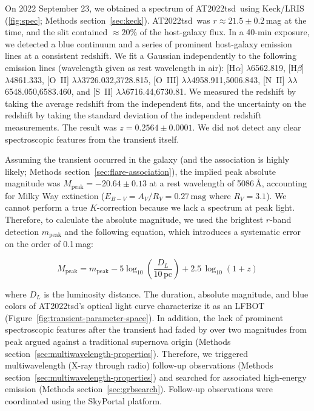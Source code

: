\documentclass{nature_plusfigure}
\newcommand{\at}{AT2022tsd}
\begin{document}
\begin{methods}
On 2022 September 23, we obtained a spectrum of \at\ using Keck/LRIS (\ref{fig:spec}; Methods section~\ref{sec:keck}).
\at\ was $r\approx21.5\pm0.2$\,mag at the time, and the slit contained $\approx20\%$ of the host-galaxy flux.
In a 40-min exposure, we detected a blue continuum and a series of prominent host-galaxy emission lines at a consistent redshift. We fit a Gaussian independently to the following emission lines (wavelength given as rest wavelength in air): [H$\alpha$] $\lambda$6562.819, [H$\beta$] $\lambda$4861.333,  [O~II] $\lambda$$\lambda$3726.032,3728.815,
 [O~III] $\lambda$$\lambda$4958.911,5006.843, 
  [N~II] $\lambda$$\lambda$6548.050,6583.460, and [S~II] $\lambda\lambda$6716.44,6730.81. 
We measured the redshift by taking the average redshift from the independent fits, and the uncertainty on the redshift by taking the standard deviation of the independent redshift measurements.
The result was $z=0.2564\pm0.0001$.
We did not detect any clear spectroscopic features from the transient itself.

Assuming the transient occurred in the galaxy (and the association is highly likely; Methods section~\ref{sec:flare-association}), the implied peak absolute magnitude was $M_{\mathrm{peak}}=-20.64\pm0.13$ at a rest wavelength of 5086\,\AA, accounting for Milky Way extinction ($E_{B-V}=A_V/R_V=0.27\,\mathrm{mag}$ where $R_V=3.1$)\cite{Finkbeiner1999,Schlegel1998,Schlafly2011}. 
We cannot perform a true $K$-correction because we lack a spectrum at peak light.
Therefore, to calculate the absolute magnitude, we used the brightest $r$-band detection $m_\mathrm{peak}$ and the following equation, which introduces a systematic error on the order of 0.1\,mag\cite{Whitesides2017}:

\begin{equation}
M_\mathrm{peak} = m_\mathrm{peak} - 5 \log_{10} \left( \frac{D_L}{10\,\mathrm{pc}} \right) + 2.5\,\log_{10} (1+z)
\end{equation}

\noindent where $D_L$ is the luminosity distance. The duration, absolute magnitude, and blue colors of \at's optical light curve characterize it as an LFBOT (Figure~\ref{fig:transient-parameter-space}). In addition, the lack of prominent spectroscopic features after the transient had faded by over two magnitudes from peak argued against a traditional supernova origin (Methods section~\ref{sec:multiwavelength-properties}). Therefore, we triggered multiwavelength (X-ray through radio) follow-up observations (Methods section~\ref{sec:multiwavelength-properties}) and searched for associated high-energy emission (Methods section~\ref{sec:grbsearch}). Follow-up observations were coordinated using the SkyPortal\cite{vanderWalt2019,Coughlin2023} platform.


\end{methods}
\end{document}
